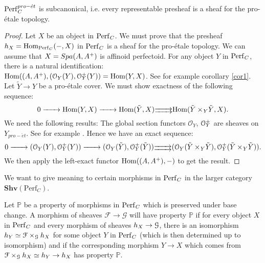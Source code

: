 \begin{prop}
$\mathrm{Perf}_{C}^{pro-\acute{e}t}$ is subcanonical, i.e. every representable presheaf is a sheaf for the pro-\'{e}tale topology. 
\end{prop}
\begin{proof}
Let $X$ be an object in $\mathrm{Perf}_{C}$. We must prove that the presheaf ${h_{X}}={\rm{Hom}}_{\mathrm{Perf}_{C}}(-,X)$ in $\mathrm{Perf}_{C}$ is a sheaf for the pro-\'{e}tale topology. 
We can assume that $X={Spa({A},{A{^{+}}})}$ is affinoid perfectoid.
For any object $Y$ in $\mathrm{Perf}_{C}$, there is a natural identification:\\
${\rm{Hom}}((A, A{^{+}}),(\mathcal{O}_{Y}(Y),\mathcal{O}{^{+}}\!\!\!\!_Y(Y))={\rm{Hom}}(Y,X)$. See for example corollary \ref{cor1}.
Let $\tilde{Y}\to Y$ be a pro-\'{e}tale cover. We must show exactness of the following sequence:
\[0 \xrightarrow{\hspace{0.65cm}} {\rm{Hom}}(Y,X)  \xrightarrow{\hspace{0.65cm}} {\rm{Hom}}(\tilde{Y},X)  \substack{\xrightarrow{\hspace{0.65cm}}\\[-1.2em] \xrightarrow{\hspace{0.65cm}}}  {\rm{Hom}}(\tilde{Y}\times\!_{Y}\tilde{Y}, X).\]
We need the following results: The global section functors $\mathcal{O}_{Y}$, $\mathcal{O}{^{+}}\!\!\!\!_Y$ are sheaves on  $Y_{pro-\acute{e}t}$. 
See for example \cite[proposition 8.2.8]{SW20}.
Hence we have an exact sequence:
\[0 \xrightarrow{\hspace{0.65cm}} (\mathcal{O}_{Y}(Y),\mathcal{O}\upplus\!\!\!\!_Y(Y))  \xrightarrow{\hspace{0.65cm}} (\mathcal{O}_{Y}(\tilde{Y}),\mathcal{O}\upplus\!\!\!\!_Y(\tilde{Y}))  \substack{\xrightarrow{\hspace{0.65cm}}\\[-1.2em] \xrightarrow{\hspace{0.65cm}}}  (\mathcal{O}_{Y}(\tilde{Y}\times\!_{Y}\tilde{Y}),\mathcal{O}\upplus\!\!\!\!_Y(\tilde{Y}\times\!_{Y}\tilde{Y})).\]
We then apply the left-exact functor ${\rm{Hom}}((A,A{^{+}}),-)$ to get the result.
\end{proof}

We want to give meaning to certain morphisms in $\mathrm{Perf}_{C}$ in the larger category $\mathbf{Shv}(\mathrm{Perf}_{C})$.
\begin{definition}
Let $\mathbb{P}$ be a property of morphisms in $\mathrm{Perf}_{C}$ which is preserved under base change.
A morphism of sheaves $\mathcal{F}\to\mathcal{G}$ will have property $\mathbb{P}$ if for every object $X$ in $\mathrm{Perf}_{C}$ and every morphism of sheaves
${h_{X}}\to\mathcal{G}$, there is an isomorphism ${h_{Y}}\simeq \mathcal{F}\times_{\mathcal{G}}{h_{X}}$ for some object $Y$ in $\mathrm{Perf}_{C}$ (which is then determined up to isomorphism) 
and if the corresponding morphism $Y\to X$ which comes from
$\mathcal{F}\times_{\mathcal{G}}{h_{X}}\simeq{h_{Y}}\to{h_{X}}$ has property $\mathbb{P}$.
\end{definition}

